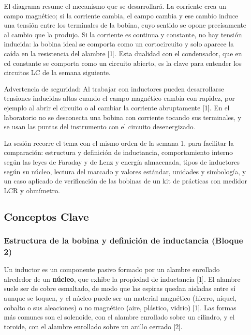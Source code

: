 \documentclass[11pt,letterpaper]{article}
\begin{document}
El diagrama resume el mecanismo que se desarrollará. La corriente crea un campo magnético; si la corriente cambia, el campo cambia y ese cambio induce una tensión entre los terminales de la bobina, cuyo sentido se opone precisamente al cambio que la produjo. Si la corriente es continua y constante, no hay tensión inducida: la bobina ideal se comporta como un cortocircuito y solo aparece la caída en la resistencia del alambre [1]. Esta dualidad con el condensador, que en cd constante se comporta como un circuito abierto, es la clave para entender los circuitos LC de la semana siguiente.

\begin{nota}{Advertencia de seguridad:}
Al trabajar con inductores pueden desarrollarse tensiones inducidas altas cuando el campo magnético cambia con rapidez, por ejemplo al abrir el circuito o al cambiar la corriente abruptamente [1]. En el laboratorio no se desconecta una bobina con corriente tocando sus terminales, y se usan las puntas del instrumento con el circuito desenergizado.
\end{nota}

La sesión recorre el tema con el mismo orden de la semana 1, para facilitar la comparación: estructura y definición de inductancia, comportamiento interno según las leyes de Faraday y de Lenz y energía almacenada, tipos de inductores según su núcleo, lectura del marcado y valores estándar, unidades y simbología, y un caso aplicado de verificación de las bobinas de un kit de prácticas con medidor LCR y ohmímetro.

\subsection{Conceptos Clave}

\subsubsection{Estructura de la bobina y definición de inductancia (Bloque 2)}

Un inductor es un componente pasivo formado por un alambre enrollado alrededor de un \textbf{núcleo}, que exhibe la propiedad de inductancia [1]. El alambre suele ser de cobre esmaltado, de modo que las espiras quedan aisladas entre sí aunque se toquen, y el núcleo puede ser un material magnético (hierro, níquel, cobalto o sus aleaciones) o no magnético (aire, plástico, vidrio) [1]. Las formas más comunes son el solenoide, con el alambre enrollado sobre un cilindro, y el toroide, con el alambre enrollado sobre un anillo cerrado [2].
\end{document}
